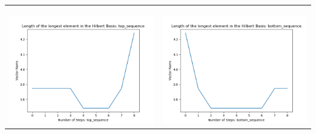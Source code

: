 \documentclass[10pt]{article}
\begin{document}
\begin{tabular}{c|c}
\begin{minipage}{.45\textwidth}
\end{minipage} \\ \\
\hline \\\begin{minipage}{.45\textwidth}
\includegraphics[width=\textwidth]{"DATA/4d/4 generators 2 bound B/top_sequence LENGTH"}
\end{minipage} &
\begin{minipage}{.45\textwidth}
\includegraphics[width=\textwidth]{"DATA/4d/4 generators 2 bound B bottomup/bottom_sequence LENGTH"}
\end{minipage}
\end{tabular}
\end{document}

